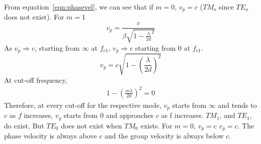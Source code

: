 From equation~\ref{eqn:phasevel}, we can see that if $m=0$, $v_{p} =c$ ($TM_o$ since $TE_o$ does not exist). For $m=1$
\begin{equation*}
v_{p}= \frac{c}{\beta \sqrt{1- \frac{\lambda}{2d}^{2}}}
\end{equation*}
As $v_{p} \Rightarrow c$, starting from $\infty$ at $f_{c1}$, $v_{g} \Rightarrow c$ starting from 0 at $f_{c1}$.
\begin{equation*}
v_{g}= c\sqrt{1-(\frac{\lambda}{2d})^{2}}
\end{equation*}
At cut-off frequency, 
\begin{align*}
1-(\frac{m\lambda}{2d})^{2} = 0
\end{align*}
Therefore, at every cut-off for the respective mode, $v_{p}$ starts from $\infty$ and tends to $c$ as $f$ increases, $v_{g}$ starts from 0 and approaches $c$ as f increases. $TM_{1}$, and $TE_{1}$, do exist, But $TE_0$ does not exist when $TM_0$ exists. For $m = 0$, $v_{p}=c$ $v_{g}=c$. The phase velocity is always above $c$ and the group velocity is always below $c$.

